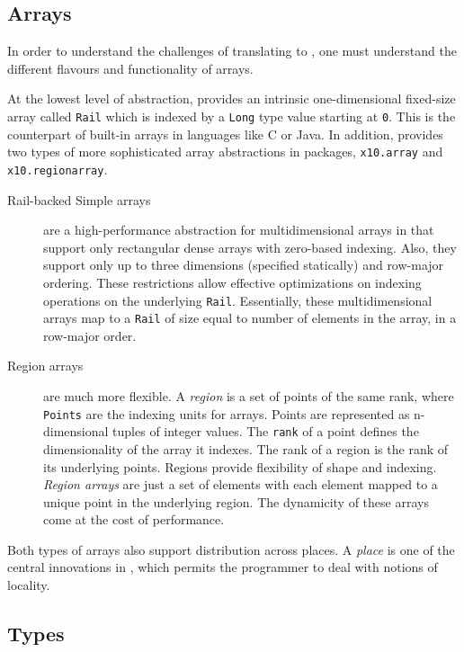 \subsection{Arrays}

In order to understand the challenges of translating \matlab to \xten,
one must understand the different flavours and functionality of \xten
arrays.

At the lowest level of abstraction, \xten provides an intrinsic
one-dimensional fixed-size array  called \verb|Rail| which is indexed by
a \verb|Long| type value starting at \verb|0|.  This is the \xten
counterpart of built-in arrays in languages like C or Java.  In
addition, \xten provides two types of more sophisticated array
abstractions in packages, \verb|x10.array| and \verb|x10.regionarray|.

\begin{description}
\item[Rail-backed Simple arrays] are a high-performance abstraction for
multidimensional arrays in \xten that support only rectangular dense
arrays with zero-based indexing. Also, they support only up to three
dimensions (specified statically) and row-major ordering. These
restrictions allow effective optimizations on indexing operations on the
underlying \verb|Rail|.  Essentially, these multidimensional arrays map
to a \verb|Rail| of size equal to number of elements in the array, in a
row-major order.

\item[Region arrays] are much more flexible.  A \emph{region} is a
set of points of the same rank, where \texttt{Points} are the indexing
units for arrays. Points are represented as n-dimensional tuples of
integer values. The \verb|rank| of a point defines the dimensionality of
the array it indexes.  The rank of a region is the rank of its
underlying points.  Regions provide flexibility of shape and indexing.
\emph{Region arrays} are just a set of elements with each element mapped
to a unique point in the underlying region. The dynamicity of these
arrays come at the cost of performance.

\end{description}
Both types of arrays also support distribution across places.  A
\emph{place} is one of the central innovations in \xten, which permits
the programmer to deal with notions of locality.


\subsection{Types}

